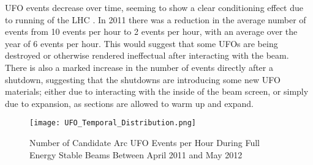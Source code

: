\documentclass[../main.tex]{subfiles}
\begin{document}
UFO events decrease over time, seeming to show a clear conditioning effect due to running of the LHC \cite{baer_distributions}.
In 2011 there was a reduction in the average number of events from 10 events per hour to 2 events per hour, with an average over the year of 6 events per hour.
This would suggest that some UFOs are being destroyed or otherwise rendered ineffectual after interacting with the beam.
There is also a marked increase in the number of events directly after a shutdown, suggesting that the shutdowns are introducing some new UFO materials; either due to interacting with the inside of the beam screen, or simply due to expansion, as sections are allowed to warm up and expand.\\

\begin{figure}[ht]
	\centering
	\texttt{[image: UFO\_Temporal\_Distribution.png]}
	\caption{Number of Candidate Arc UFO Events per Hour During Full Energy Stable Beams Between April 2011 and May 2012 \cite{baer_distributions}}
\end{figure}
\end{document}
